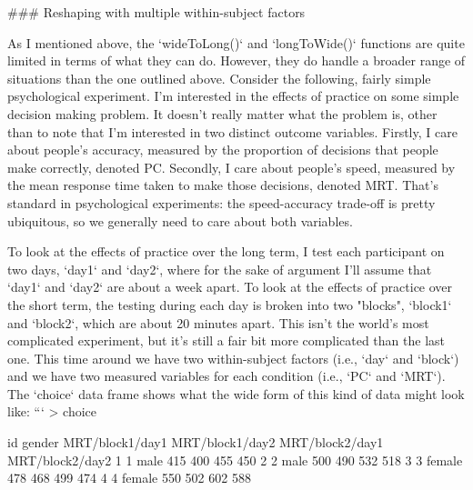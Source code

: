 ### Reshaping with multiple within-subject factors

As I mentioned above, the `wideToLong()` and `longToWide()` functions are quite limited in terms of what they can do. However, they do handle a broader range of situations than the one outlined above. Consider the following, fairly simple psychological experiment. I'm interested in the effects of practice on some simple decision making problem. It doesn't really matter what the problem is, other than to note that I'm interested in two distinct outcome variables. Firstly, I care about people's accuracy, measured by the proportion of decisions that people make correctly, denoted PC. Secondly, I care about people's speed, measured by the mean response time taken to make those decisions, denoted MRT. That's standard in psychological experiments: the speed-accuracy trade-off is pretty ubiquitous, so we generally need to care about both variables.

To look at the effects of practice over the long term, I test each participant on two days, `day1` and `day2`, where for the sake of argument I'll assume that `day1` and `day2` are about a week apart. To look at the effects of practice over the short term, the testing during each day is broken into two "blocks", `block1` and `block2`, which are about 20 minutes apart. This isn't the world's most complicated experiment, but it's still a fair bit more complicated than the last one. This time around we have two within-subject factors (i.e., `day` and `block`) and we have two measured variables for each condition (i.e., `PC` and `MRT`). The `choice` data frame shows what the wide form of this kind of data might look like: 
```
> choice

  id gender MRT/block1/day1 MRT/block1/day2 MRT/block2/day1 MRT/block2/day2
1  1   male             415             400             455             450
2  2   male             500             490             532             518
3  3 female             478             468             499             474
4  4 female             550             502             602             588

